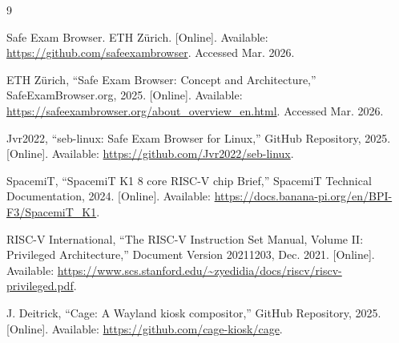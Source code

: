 \documentclass[11pt]{article}
\begin{document}
\begin{thebibliography}{9}

Safe Exam Browser. ETH Z\"{u}rich. [Online]. Available: \url{https://github.com/safeexambrowser}. Accessed Mar. 2026.

ETH Z\"{u}rich, ``Safe Exam Browser: Concept and Architecture,'' SafeExamBrowser.org, 2025. [Online]. Available: \url{https://safeexambrowser.org/about_overview_en.html}. Accessed Mar. 2026.

Jvr2022, ``seb-linux: Safe Exam Browser for Linux,'' GitHub Repository, 2025. [Online]. Available: \url{https://github.com/Jvr2022/seb-linux}.

SpacemiT, ``SpacemiT K1 8 core RISC-V chip Brief,'' SpacemiT Technical Documentation, 2024. [Online]. Available: \url{https://docs.banana-pi.org/en/BPI-F3/SpacemiT_K1}.

RISC-V International, ``The RISC-V Instruction Set Manual, Volume II: Privileged Architecture,'' Document Version 20211203, Dec. 2021. [Online]. Available: \url{https://www.scs.stanford.edu/~zyedidia/docs/riscv/riscv-privileged.pdf}.

J. Deitrick, ``Cage: A Wayland kiosk compositor,'' GitHub Repository, 2025. [Online]. Available: \url{https://github.com/cage-kiosk/cage}.

\end{thebibliography}
\end{document}
